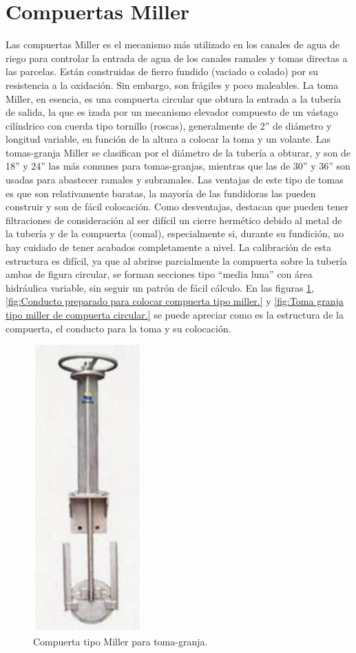 \section{Compuertas Miller}
\label{sec:Compuertas miller}
Las compuertas Miller es el mecanismo más utilizado en los canales de agua de riego para controlar la entrada de agua de los canales ramales y tomas directas a las parcelas. Están construidas de fierro fundido (vaciado o colado) por su resistencia a la oxidación. Sin embargo, son frágiles y poco maleables. La toma Miller, en esencia, es una compuerta circular que obtura la entrada a la tubería de salida, la que es izada por un mecanismo elevador compuesto de un vástago cilíndrico con cuerda tipo tornillo (roscas), generalmente de 2” de diámetro y longitud variable, en función de la altura a colocar la toma y un volante. Las tomas-granja Miller se clasifican por el diámetro de la tubería a obturar, y son de 18” y 24” las más comunes para tomas-granjas, mientras que las de 30” y 36” son usadas para abastecer ramales y subramales.
Las ventajas de este tipo de tomas es que son relativamente baratas, la mayoría de las fundidoras las pueden construir y son de fácil colocación. Como desventajas, destacan que pueden tener filtraciones de consideración al ser difícil un cierre hermético debido al metal de la tubería y de la compuerta (comal), especialmente si, durante su fundición, no hay cuidado de tener acabados completamente a nivel. La calibración de esta estructura es difícil, ya que al abrirse parcialmente la compuerta sobre la tubería ambas de figura circular, se forman secciones tipo “media luna” con área hidráulica variable, sin seguir un patrón de fácil cálculo. 
En las figuras \ref{fig:Compuerta tipo miller para toma-granja}, \ref{fig:Conducto preparado para colocar compuerta tipo miller.} y \ref{fig:Toma granja tipo miller de compuerta circular.} se puede apreciar como es la estructura de la compuerta, el conducto para la toma y su colocación.

\begin{figure}[h]
\centering
\includegraphics[scale=.65]{./Figures/CompuertaMiller.jpeg}
\caption{Compuerta tipo Miller para toma-granja.}
\label{fig:Compuerta tipo miller para toma-granja}
\end{figure}

